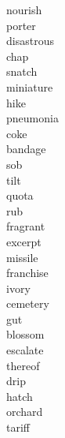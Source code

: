 \documentclass[a4paper, 11pt]{ctexart}
\begin{document}
\begin{multicols*}{3}
\begin{description}
\item[nourish]

\item[porter]

\item[disastrous]

\item[chap]

\item[snatch]

\item[miniature]

\item[hike]

\item[pneumonia]

\item[coke]

\item[bandage]

\item[sob]

\item[tilt]

\item[quota]

\item[rub]

\item[fragrant]

\item[excerpt]

\item[missile]

\item[franchise]

\item[ivory]

\item[cemetery]

\item[gut]

\item[blossom]

\item[escalate]

\item[thereof]

\item[drip]

\item[hatch]

\item[orchard]

\item[tariff]


\end{description}
\end{multicols*}
\end{document}
